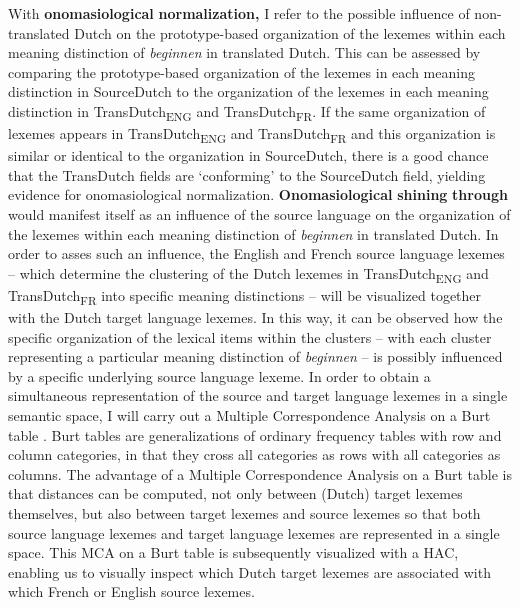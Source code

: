 With \textbf{onomasiological} \textbf{normalization,} I refer to the possible influence of non-translated Dutch on the prototype-based organization of the lexemes within each meaning distinction of \textit{beginnen} in translated Dutch. This can be assessed by comparing the prototype-based organization of the lexemes in each meaning distinction in SourceDutch to the organization of the lexemes in each meaning distinction in TransDutch\textsubscript{ENG} and TransDutch\textsubscript{FR}. If the same organization of lexemes appears in TransDutch\textsubscript{ENG} and TransDutch\textsubscript{FR} and this organization is similar or identical to the organization in SourceDutch, there is a good chance that the TransDutch fields are ‘conforming’ to the SourceDutch field, yielding evidence for onomasiological normalization. \textbf{Onomasiological} \textbf{shining} \textbf{through} would manifest itself as an influence of the source language on the organization of the lexemes within each meaning distinction of \textit{beginnen} in translated Dutch. In order to asses such an influence, the English and French source language lexemes – which determine the clustering of the Dutch lexemes in TransDutch\textsubscript{ENG} and TransDutch\textsubscript{FR} into specific meaning distinctions – will be visualized together with the Dutch target language lexemes. In this way, it can be observed how the specific organization of the lexical items within the clusters – with each cluster representing a particular meaning distinction of \textit{beginnen} – is possibly influenced by a specific underlying source language lexeme. In order to obtain a simultaneous representation of the source and target language lexemes in a single semantic space, I will carry out a Multiple Correspondence Analysis on a Burt table \citep{greenacre_simple_2006, greenacre_correspondence_2007}. Burt tables are generalizations of ordinary frequency tables with row and column categories, in that they cross all categories as rows with all categories as columns. The advantage of a Multiple Correspondence Analysis on a Burt table is that distances can be computed, not only between (Dutch) target lexemes themselves, but also between target lexemes and source lexemes so that both source language lexemes and target language lexemes are represented in a single space. This MCA on a Burt table is subsequently visualized with a HAC, enabling us to visually inspect which Dutch target lexemes are associated with which French or English source lexemes.

